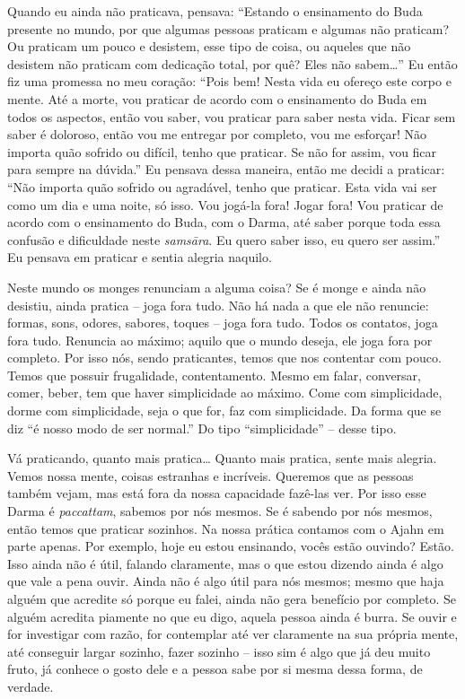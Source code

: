 Quando eu ainda não praticava, pensava: “Estando o ensinamento do
Buda presente no mundo, por que algumas pessoas praticam e algumas não
praticam? Ou praticam um pouco e desistem, esse tipo de coisa, ou
aqueles que não desistem não praticam com dedicação total, por quê?
Eles não sabem…” Eu então fiz uma promessa no meu coração: “Pois bem!
Nesta vida eu ofereço este corpo e mente. Até a morte, vou praticar de
acordo com o ensinamento do Buda em todos os aspectos, então vou saber,
vou praticar para saber nesta vida. Ficar sem saber é doloroso, então
vou me entregar por completo, vou me esforçar! Não importa quão sofrido
ou difícil, tenho que praticar. Se não for assim, vou ficar para sempre
na dúvida.” Eu pensava dessa maneira, então me decidi a praticar: “Não
importa quão sofrido ou agradável, tenho que praticar. Esta vida vai
ser como um dia e uma noite, só isso. Vou jogá-la fora! Jogar fora! Vou
praticar de acordo com o ensinamento do Buda, com o Darma, até saber
porque toda essa confusão e dificuldade neste \textit{samsāra}. Eu
quero saber isso, eu quero ser assim.” Eu pensava em praticar e sentia
alegria naquilo. 

Neste mundo os monges renunciam a alguma coisa? Se é monge e ainda
não desistiu, ainda pratica – joga fora tudo. Não há nada a que ele não
renuncie: formas, sons, odores, sabores, toques – joga fora tudo. Todos
os contatos, joga fora tudo. Renuncia ao máximo; aquilo que o mundo
deseja, ele joga fora por completo. Por isso nós, sendo praticantes,
temos que nos contentar com pouco. Temos que possuir frugalidade,
contentamento. Mesmo em falar, conversar, comer, beber, tem que haver
simplicidade ao máximo. Come com simplicidade, dorme com simplicidade,
seja o que for, faz com simplicidade. Da forma que se diz “é nosso modo
de ser normal.” Do tipo “simplicidade” – desse tipo. 

Vá praticando, quanto mais pratica… Quanto mais pratica, sente mais
alegria. Vemos nossa mente, coisas estranhas e incríveis. Queremos que
as pessoas também vejam, mas está fora da nossa capacidade fazê-las
ver. Por isso esse Darma é \textit{paccattam}, sabemos por nós mesmos.
Se é sabendo por nós mesmos, então temos que praticar sozinhos. Na
nossa prática contamos com o Ajahn em parte apenas. Por exemplo, hoje
eu estou ensinando, vocês estão ouvindo? Estão. Isso ainda não é útil,
falando claramente, mas o que estou dizendo ainda é algo que vale a
pena ouvir. Ainda não é algo útil para nós mesmos; mesmo que haja
alguém que acredite só porque eu falei, ainda não gera benefício por
completo. Se alguém acredita piamente no que eu digo, aquela pessoa
ainda é burra. Se ouvir e for investigar com razão, for contemplar até
ver claramente na sua própria mente, até conseguir largar sozinho,
fazer sozinho – isso sim é algo que já deu muito fruto, já conhece o
gosto dele e a pessoa sabe por si mesma dessa forma, de verdade. 

